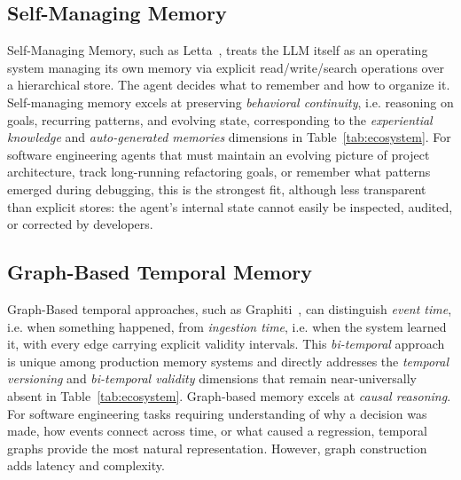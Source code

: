 \documentclass[runningheads]{llncs}
\begin{document}
\subsection{Self-Managing Memory}

Self-Managing Memory, such as Letta~\cite{packer2023}, treats the LLM itself as an operating system
managing its own memory via explicit read/write/search operations over a
hierarchical store. The agent decides what to remember and how to
organize it. Self-managing memory excels at preserving
\emph{behavioral continuity}, i.e. reasoning on goals, recurring patterns, and evolving
state, corresponding to the \emph{experiential knowledge} and \emph{auto-generated memories} dimensions in Table~\ref{tab:ecosystem}. For software engineering agents that must maintain an evolving picture of project
architecture, track long-running refactoring goals, or remember
what patterns emerged during debugging, this is the
strongest fit, although less transparent
than explicit stores: the agent's internal state cannot easily be
inspected, audited, or corrected by developers. 

\subsection{Graph-Based Temporal Memory}

Graph-Based temporal approaches, such as Graphiti~\cite{rasmussen2025}, can distinguish \emph{event time}, i.e. when
something happened, from \emph{ingestion time}, i.e. when the system learned
it, with every edge carrying explicit validity intervals. This
\emph{bi-temporal} approach is unique among production memory systems and directly addresses the \emph{temporal versioning} and \emph{bi-temporal validity} dimensions that remain near-universally absent in Table~\ref{tab:ecosystem}.
Graph-based memory excels at \emph{causal
reasoning}. For software engineering tasks requiring understanding of why a
decision was made, how events connect across time, or what caused a
regression, temporal graphs provide the most natural representation.
However, graph construction adds latency and complexity. 

\end{document}
